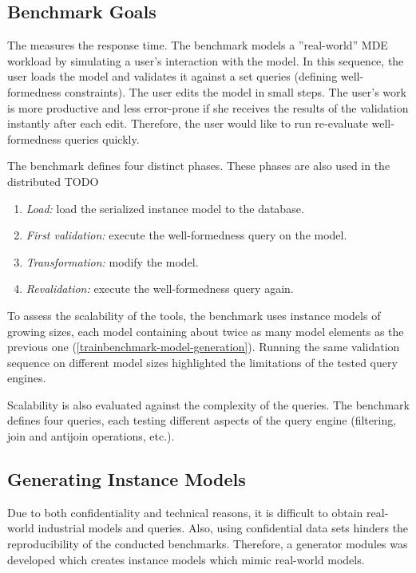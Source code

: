 \subsection{Benchmark Goals}

The \tb{} measures the response time. The benchmark models a ''real-world'' MDE workload by simulating a user's interaction with the model. In this sequence, the user loads the model and validates it against a set  queries (defining well-formedness constraints). The user edits the model in small steps. The user's work is more productive and less error-prone if she receives the results of the validation instantly after each edit. Therefore, the user would like to run re-evaluate well-formedness queries quickly.

The benchmark defines four distinct phases. These phases are also used in the distributed \tb{} TODO

\begin{enumerate}
  \item \emph{Load:} load the serialized instance model to the database.
  \item \emph{First validation:} execute the well-formedness query on the model.
  \item \emph{Transformation:} modify the model.
  \item \emph{Revalidation:} execute the well-formedness query again.
\end{enumerate}

To assess the scalability of the tools, the benchmark uses instance models of growing sizes, each model containing about twice as many model elements as the previous one (\autoref{trainbenchmark-model-generation}). Running the same validation sequence on different model sizes highlighted the limitations of the tested query engines.


Scalability is also evaluated against the complexity of the queries. The benchmark defines four queries, each testing different aspects of the query engine (filtering, join and antijoin operations, etc.).

\subsection{Generating Instance Models}
\label{trainbenchmark-model-generation}

Due to both confidentiality and technical reasons, it is difficult to obtain real-world industrial models and queries. Also, using confidential data sets hinders the reproducibility of the conducted benchmarks. Therefore, a generator modules was developed which creates instance models which mimic real-world models.

